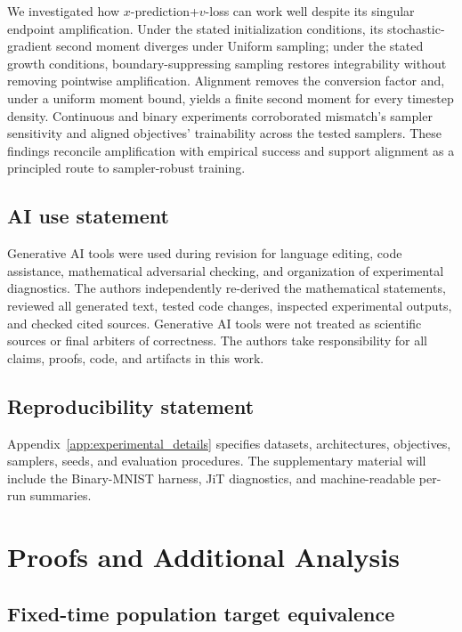 \documentclass{article}
\theoremstyle{plain}
\theoremstyle{definition}
\theoremstyle{remark}
\begin{document}
We investigated how $x$-prediction+$v$-loss can work well despite its singular endpoint amplification. Under the stated initialization conditions, its stochastic-gradient second moment diverges under Uniform sampling; under the stated growth conditions, boundary-suppressing sampling restores integrability without removing pointwise amplification. Alignment removes the conversion factor and, under a uniform moment bound, yields a finite second moment for every timestep density. Continuous and binary experiments corroborated mismatch's sampler sensitivity and aligned objectives' trainability across the tested samplers. These findings reconcile amplification with empirical success and support alignment as a principled route to sampler-robust training.

\subsection*{AI use statement}

Generative AI tools were used during revision for language editing, code assistance, mathematical adversarial checking, and organization of experimental diagnostics. The authors independently re-derived the mathematical statements, reviewed all generated text, tested code changes, inspected experimental outputs, and checked cited sources. Generative AI tools were not treated as scientific sources or final arbiters of correctness. The authors take responsibility for all claims, proofs, code, and artifacts in this work.

\subsection*{Reproducibility statement}

Appendix~\ref{app:experimental_details} specifies datasets, architectures, objectives, samplers, seeds, and evaluation procedures. The supplementary material will include the Binary-MNIST harness, JiT diagnostics, and machine-readable per-run summaries.




\appendix
\section{Proofs and Additional Analysis}
\label{app:proofs}

\subsection{Fixed-time population target equivalence}
\label{app:flow_target_proof}
\end{document}
